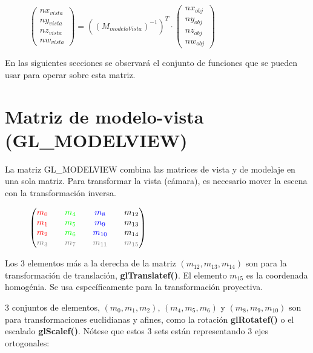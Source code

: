 \begin{figure}[ht]
  \centering
  \(
  \begin{pmatrix}
    nx_{vista}\\ny_{vista}\\nz_{vista}\\nw_{vista}
  \end{pmatrix}
  = ((M_{modeloVista})^{-1})^T \cdot
  \begin{pmatrix}
    nx_{obj}\\ny_{obj}\\nz_{obj}\\nw_{obj}
  \end{pmatrix}
  \)
\end{figure}
En las siguientes secciones se observará el conjunto de funciones que se pueden usar para operar sobre esta matriz.

\section{Matriz de modelo-vista (GL\_MODELVIEW)}
La matriz GL\_MODELVIEW combina las matrices de vista y de modelaje en una sola matriz. Para transformar la vista (cámara), es necesario mover la escena con la transformación inversa.

\begin{figure}[ht]
  \centering
  \(
  \begin{pmatrix}
    \textcolor{red}{m_0} && \textcolor{green}{m_4} && \textcolor{blue}{m_8} && m_{12}\\
    \textcolor{red}{m_1} && \textcolor{green}{m_5} && \textcolor{blue}{m_9} && m_{13}\\
    \textcolor{red}{m_2} && \textcolor{green}{m_6} && \textcolor{blue}{m_{10}} && m_{14}\\
    \textcolor{gray}{m_3} && \textcolor{gray}{m_7} && \textcolor{gray}{m_{11}} && \textcolor{gray}{m_{15}}
  \end{pmatrix}
  \)
\end{figure}

Los 3 elementos más a la derecha de la matriz \((m_{12}, m_{13}, m_{14})\) son para la transformación de translación, \textbf{glTranslatef()}. El elemento \(m_{15}\) es la coordenada homogénia. Se usa específicamente para la transformación proyectiva.

3 conjuntos de elementos, \((m_0, m_1, m_2)\), \((m_4, m_5, m_6)\) y \((m_8, m_9, m_{10})\) son para transformaciones euclidianas y afines, como la rotación \textbf{glRotatef()} o el escalado \textbf{glScalef()}. Nótese que estos 3 sets están representando 3 ejes ortogonales:

